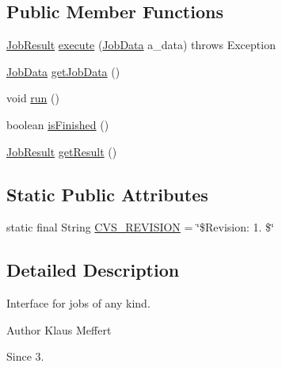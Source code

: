 \subsection*{Public Member Functions}
\begin{DoxyCompactItemize}
\item 
\hyperlink{classorg_1_1jgap_1_1impl_1_1job_1_1_job_result}{Job\-Result} \hyperlink{interfaceorg_1_1jgap_1_1impl_1_1job_1_1_i_job_a5318a1ce0e973553131c3cb268c8b3f2}{execute} (\hyperlink{classorg_1_1jgap_1_1impl_1_1job_1_1_job_data}{Job\-Data} a\-\_\-data)  throws Exception
\item 
\hyperlink{classorg_1_1jgap_1_1impl_1_1job_1_1_job_data}{Job\-Data} \hyperlink{interfaceorg_1_1jgap_1_1impl_1_1job_1_1_i_job_aee1614176eba42e6405b0ae1ce216754}{get\-Job\-Data} ()
\item 
void \hyperlink{interfaceorg_1_1jgap_1_1impl_1_1job_1_1_i_job_adab19ae6b78cabf77f43aefb5aa74650}{run} ()
\item 
boolean \hyperlink{interfaceorg_1_1jgap_1_1impl_1_1job_1_1_i_job_a9b72a2342b23ac0cfba5d41dde3ef8ac}{is\-Finished} ()
\item 
\hyperlink{classorg_1_1jgap_1_1impl_1_1job_1_1_job_result}{Job\-Result} \hyperlink{interfaceorg_1_1jgap_1_1impl_1_1job_1_1_i_job_a2bcd1a7d7f165baba66b8fa4e0b9bf43}{get\-Result} ()
\end{DoxyCompactItemize}
\subsection*{Static Public Attributes}
\begin{DoxyCompactItemize}
\item 
static final String \hyperlink{interfaceorg_1_1jgap_1_1impl_1_1job_1_1_i_job_a8d76655b9eddf18c2cc184cb362dd0e3}{C\-V\-S\-\_\-\-R\-E\-V\-I\-S\-I\-O\-N} = \char`\"{}\$Revision\-: 1. \$\char`\"{}
\end{DoxyCompactItemize}


\subsection{Detailed Description}
Interface for jobs of any kind.

\begin{DoxyAuthor}{Author}
Klaus Meffert 
\end{DoxyAuthor}
\begin{DoxySince}{Since}
3. 
\end{DoxySince}


